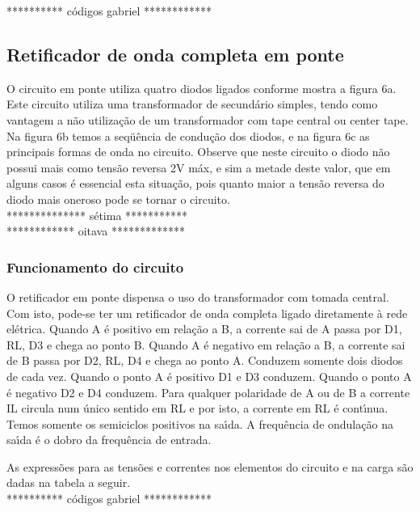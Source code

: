 ********** c\'{o}digos gabriel ************ \\

\subsection{Retificador de onda completa em ponte}
O circuito em ponte utiliza quatro diodos ligados conforme mostra a figura 6a. Este circuito utiliza uma transformador de secund\'{a}rio simples, tendo como vantagem a n\~{a}o utiliza\c{c}\~{a}o de um transformador com tape central ou center tape. Na figura 6b temos a seq\"{u}\^{e}ncia de condu\c{c}\~{a}o dos diodos, e na figura 6c as principais formas de onda no circuito. Observe que neste circuito o diodo n\~{a}o possui mais como tens\~{a}o reversa 2V m\'{a}x, e sim a metade deste valor, que em alguns casos \'{e} essencial esta situa\c{c}\~{a}o, pois quanto maior a tens\~{a}o reversa do diodo mais oneroso pode se tornar o circuito. \\

************** s\'{e}tima *********** \\
************ oitava ************* \\ 

\subsubsection{Funcionamento do circuito}
O retificador em ponte dispensa o uso do transformador com tomada central. Com isto, pode-se ter um retificador de onda completa ligado diretamente \`{a} rede el\'{e}trica. Quando A \'{e} positivo em rela\c{c}\~{a}o a B, a corrente sai de A passa por D1, RL, D3 e chega ao ponto B. Quando A \'{e} negativo em rela\c{c}\~{a}o a B, a corrente sai de B passa por D2, RL, D4 e chega ao ponto A. Conduzem somente dois diodos de cada vez. Quando o ponto A \'{e} positivo D1 e D3 conduzem. Quando o ponto A \'{e} negativo D2 e D4 conduzem. Para qualquer polaridade de A ou de B a corrente IL circula num \'{u}nico sentido em RL e por isto, a corrente em RL \'{e} cont\'{\i}nua. Temos somente os semiciclos positivos na sa\'{\i}da. A frequ\^{e}ncia de ondula\c{c}\~{a}o na sa\'{\i}da \'{e} o dobro da frequ\^{e}ncia de entrada.

As express\~{o}es para as tens\~{o}es e correntes nos elementos do circuito e na carga s\~{a}o dadas na tabela a seguir.\\

********** c\'{o}digos gabriel ************ \\

